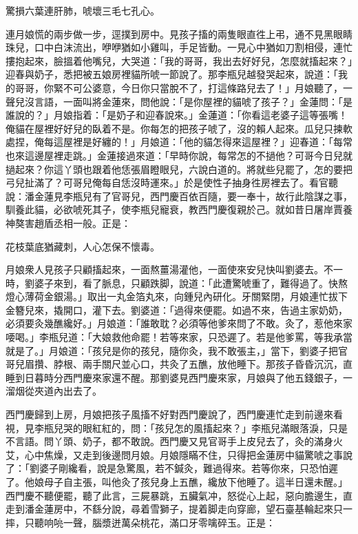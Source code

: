 驚損六葉連肝肺，唬壞三毛七孔心。

連月娘慌的兩步做一步，逕撲到房中。見孩子搐的兩隻眼直徃上弔，通不見黑眼睛珠兒，口中白沫流出，咿咿猶如小雞叫，手足皆動。一見心中猶如刀割相侵，連忙摟抱起來，臉搵着他嘴兒，大哭道：「我的哥哥，我出去好好兒，怎麼就搐起來？」迎春與奶子，悉把被五娘房裡貓所唬一節說了。那李瓶兒越發哭起來，說道：「我的哥哥，你緊不可公婆意，今日你只當脫不了，打這條路兒去了！」{}月娘聽了，一聲兒沒言語，一面叫將金蓮來，問他說：{}「是你屋裡的貓唬了孩子？」金蓮問：「是誰說的？」月娘指着：「是奶子和迎春說來。」金蓮道：「你看這老婆子這等張嘴！俺貓在屋裡好好兒的臥着不是。你每怎的把孩子唬了，沒的賴人起來。瓜兒只揀軟處捏，俺每這屋裡是好纏的！」月娘道：「他的貓怎得來這屋裡？」迎春道：「每常也來這邊屋裡走跳。」金蓮接過來道：「早時你說，每常怎的不撾他？可哥今日兒就撾起來？你這丫頭也跟着他恁張眉瞪眼兒，六說白道的。將就些兒罷了，怎的要把弓兒扯滿了？可哥兒俺每自恁沒時運來。」{}於是使性子抽身徃房裡去了。看官聽說：潘金蓮見李瓶兒有了官哥兒，西門慶百依百隨，要一奉十，故行此陰謀之事，馴養此貓，必欲唬死其子，使李瓶兒寵衰，教西門慶復親於己。就如昔日屠岸賈養神獒害趙盾丞相一般。{}正是：

花枝葉底猶藏刺，人心怎保不懷毒。

月娘衆人見孩子只顧搐起來，一面熬薑湯灌他，一面使來安兒快叫劉婆去。不一時，劉婆子來到，看了脈息，只顧跌脚，說道：「此遭驚唬重了，難得過了。快熬燈心薄荷金銀湯。」取出一丸金箔丸來，向鍾兒內研化。牙關緊閉，月娘連忙拔下金簪兒來，撬開口，灌下去。劉婆道：「過得來便罷。如過不來，告過主家奶奶，必須要灸幾醮纔好。」月娘道：「誰敢耽？必須等他爹來問了不敢。灸了，惹他來家喓喝。」李瓶兒道：「大娘救他命罷！若等來家，只恐遲了。若是他爹罵，等我承當就是了。」月娘道：「孩兒是你的孩兒，隨你灸，我不敢張主，」當下，劉婆子把官哥兒眉攢、脖根、兩手關尺並心口，共灸了五醮，放他睡下。那孩子昏昏沉沉，直睡到日暮時分西門慶來家還不醒。那劉婆見西門慶來家，月娘與了他五錢銀子，一溜烟從夾道內出去了。

西門慶歸到上房，月娘把孩子風搐不好對西門慶說了，西門慶連忙走到前邊來看視，見李瓶兒哭的眼紅紅的，問：「孩兒怎的風搐起來？」李瓶兒滿眼落淚，只是不言語。問丫頭、奶子，都不敢說。西門慶又見官哥手上皮兒去了，灸的滿身火艾，心中焦燥，又走到後邊問月娘。月娘隱瞞不住，只得把金蓮房中貓驚唬之事說了：「劉婆子剛纔看，說是急驚風，若不鍼灸，難過得來。若等你來，只恐怕遲了。他娘母子自主張，叫他灸了孩兒身上五醮，纔放下他睡了。這半日還未醒。」西門慶不聽便罷，聽了此言，三屍暴跳，五臟氣冲，怒從心上起，惡向膽邊生，直走到潘金蓮房中，不繇分說，尋着雪獅子，提着脚走向穿廊，望石臺基輪起來只一摔，只聽响喨一聲，腦漿迸萬朵桃花，滿口牙零噙碎玉。正是：

